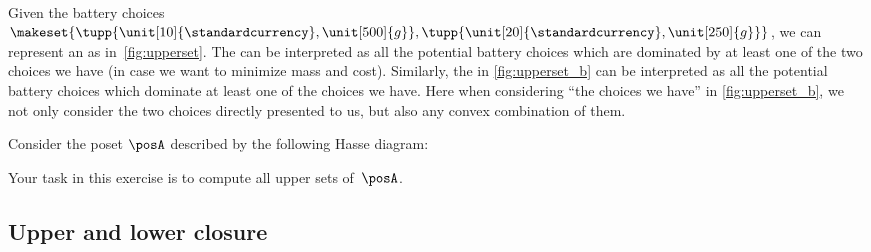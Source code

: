 \begin{marginfigure}
    \\
    \caption{}
\end{marginfigure}
%

Given the battery choices~$\makeset{\tupp{\unit[10]{\standardcurrency},\unit[500]{g}}, \tupp{\unit[20]{\standardcurrency},\unit[250]{g}}}$, we can represent an  as in~\cref{fig:upperset}.
The  can be interpreted as all the potential battery choices which are dominated by at least one of the two choices we have (in case we want to minimize mass and cost).
Similarly, the  in \cref{fig:upperset_b} can be interpreted as all the potential battery choices which dominate at least one of the choices we have.
Here when considering ``the choices we have'' in \cref{fig:upperset_b}, we not only consider the two choices directly presented to us, but also any convex combination of them.


\begin{gradedexercise}
    \label{ex:UpperSetsOfPreferences}

    Consider the poset $\posA$ described by the following Hasse diagram:
    \begin{center}
    \end{center}
    Your task in this exercise is to compute all upper sets of~$\posA$.
\end{gradedexercise}


\subsection{Upper and lower closure}


